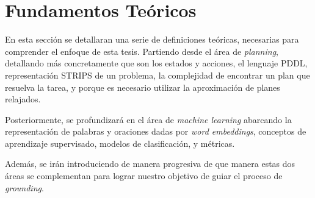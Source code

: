 \chapter{Fundamentos Teóricos}
\label{ch:lit_rev} %

En esta sección se detallaran una serie de definiciones teóricas, necesarias para comprender el enfoque de esta tesis. Partiendo desde el área de \emph{planning}, detallando más concretamente que son los estados y acciones, el lenguaje PDDL, representación STRIPS de un problema, la complejidad de encontrar un plan que resuelva la tarea, y porque es necesario utilizar la aproximación de planes relajados.

Posteriormente, se profundizará en el área de \emph{machine learning} abarcando la representación de palabras y oraciones dadas por \emph{word embeddings}, conceptos de aprendizaje supervisado, modelos de clasificación, y métricas.

Además, se irán introduciendo de manera progresiva de que manera estas dos áreas se complementan para lograr nuestro objetivo de guiar el proceso de \emph{grounding}.

\section{} 